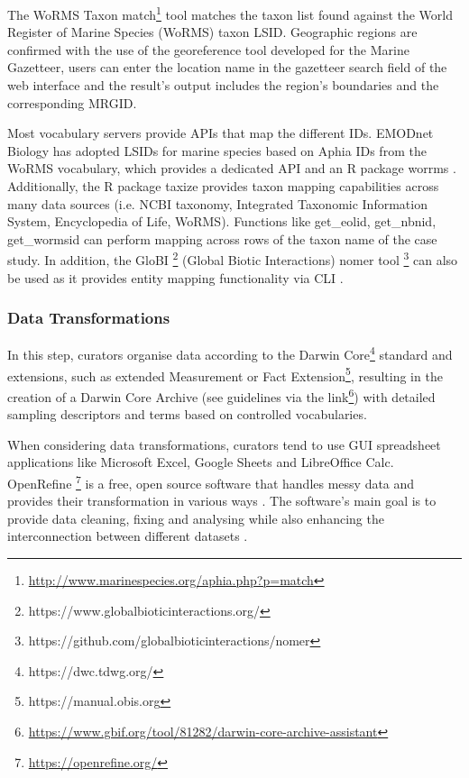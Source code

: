 The WoRMS Taxon match\footnote{\url{http://www.marinespecies.org/aphia.php?p=match}}
tool matches the taxon list found against the World Register of Marine Species
(WoRMS) taxon LSID. Geographic regions are confirmed with the use of the
georeference tool developed for the Marine Gazetteer, users can enter the
location name in the gazetteer search field of the web interface and the
result’s output includes the region’s boundaries and the corresponding MRGID.

Most vocabulary servers provide APIs that map the different IDs. EMODnet Biology
has adopted LSIDs for marine species based on Aphia IDs from the
WoRMS vocabulary, which provides a dedicated API and an R package worrms
\cite{chamberlain_worrms_2020}. Additionally, the R package taxize
\cite{chamberlain_taxize_2013} provides taxon mapping capabilities across many
data sources (i.e. NCBI taxonomy, Integrated Taxonomic Information System,
Encyclopedia of Life, WoRMS). Functions like get\_eolid, get\_nbnid, get\_wormsid
can perform mapping across rows of the taxon name of the case study. In
addition, the GloBI \footnote{https://www.globalbioticinteractions.org/}
(Global Biotic Interactions) nomer tool
\footnote{https://github.com/globalbioticinteractions/nomer}
\cite{poelen_globalbioticinteractionsnomer_2022} can also be used as it
provides entity mapping functionality via CLI \cite{poelen_global_2014}.

   \subsubsection{Data Transformations}
   In this step, curators organise data according to the Darwin
Core\footnote{https://dwc.tdwg.org/} standard and extensions, such as extended
Measurement or Fact Extension\footnote{https://manual.obis.org}, resulting in
the creation of a Darwin Core Archive (see guidelines via the
link\footnote{\url{https://www.gbif.org/tool/81282/darwin-core-archive-assistant}})
with detailed sampling descriptors and terms based on controlled vocabularies.

When considering data transformations, curators tend to use GUI spreadsheet
applications like Microsoft Excel, Google Sheets and LibreOffice Calc.
OpenRefine \footnote{\url{https://openrefine.org/}} is a free, open source software that
handles messy data and provides their transformation in various
ways \cite{ham_openrefine_2013}. The software’s main goal is to provide data
cleaning, fixing and analysing while also enhancing the interconnection between
different datasets \cite{verborgh_using_2013}.

